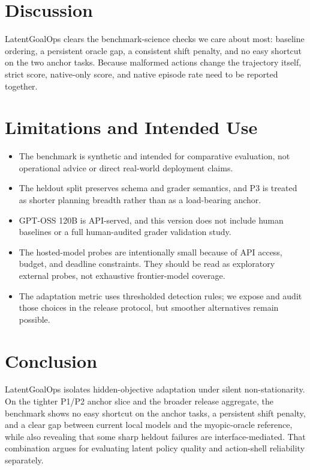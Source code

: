 \documentclass{article}
\newif\ifincludeappendix
\newif\ifincludechecklist
\begin{document}
\section{Discussion}

LatentGoalOps clears the benchmark-science checks we care about most: baseline
ordering, a persistent oracle gap, a consistent shift penalty, and no easy
shortcut on the two anchor tasks. Because malformed actions change the
trajectory itself, strict score, native-only score, and native episode rate
need to be reported together.

\section{Limitations and Intended Use}

\begin{itemize}[leftmargin=1.5em]
  \item The benchmark is synthetic and intended for comparative evaluation, not
  operational advice or direct real-world deployment claims.
  \item The heldout split preserves schema and grader semantics, and P3 is
  treated as shorter planning breadth rather than as a load-bearing anchor.
  \item GPT-OSS 120B is API-served, and this version does not include human
  baselines or a full human-audited grader validation study.
  \item The hosted-model probes are intentionally small because of API access,
  budget, and deadline constraints. They should be read as exploratory
  external probes, not exhaustive frontier-model coverage.
  \item The adaptation metric uses thresholded detection rules; we expose and
  audit those choices in the release protocol, but smoother alternatives remain
  possible.
\end{itemize}

\section{Conclusion}

LatentGoalOps isolates hidden-objective adaptation under silent
non-stationarity. On the tighter P1/P2 anchor slice and the broader release
aggregate, the benchmark shows no easy shortcut on the anchor tasks, a
persistent shift penalty, and a clear gap between current local models and the
myopic-oracle reference, while also revealing that some sharp heldout failures
are interface-mediated. That combination argues for evaluating latent policy
quality and action-shell reliability separately.




\ifincludeappendix
  \clearpage
  \appendix
  
\fi

\ifincludechecklist
  \clearpage
  
\fi
\end{document}
